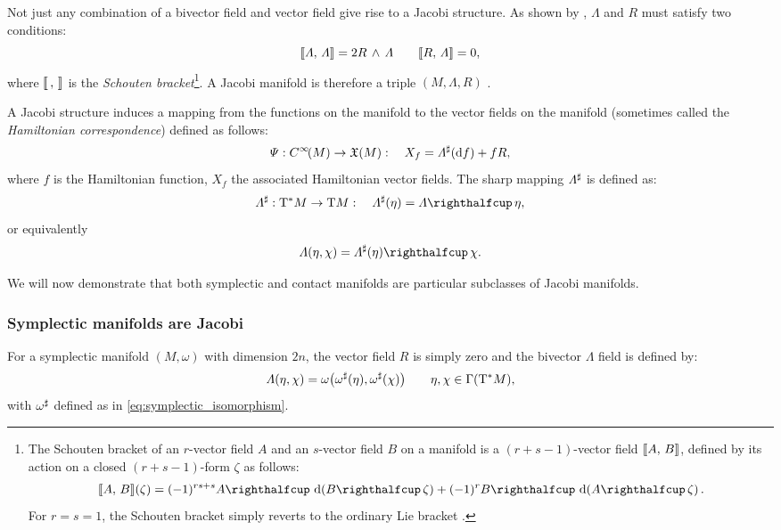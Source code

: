 Not just any combination of a bivector field and vector field give rise to a Jacobi structure. As shown by \citet{lichnerowicz1977}, \(\Lambda\) and \(R\) must satisfy two conditions:
\begin{equation}
     \llbracket\Lambda,\,\Lambda\rrbracket = 2  R\,\wedge\,\Lambda  \qquad \llbracket R,\,\Lambda\rrbracket = 0,
\end{equation}
where \(\llbracket\,,\,\rrbracket\) is the \emph{Schouten bracket}\footnote
{
    The Schouten bracket of an \(r\)-vector field \(A\) and an \(s\)-vector field \(B\) on a manifold is a \((r + s - 1)\)-vector field \(\llbracket A,\,B\rrbracket\), defined by its action on a closed \((r + s -1)\)-form \(\zeta\) as follows:
    \begin{equation}
     \schouten{A}{B}(\zeta) = (-1)^{rs + s}\intpr{A}{\dd{(\intpr{B}{\zeta})}} + (-1)^r \intpr{B}{\dd{(\intpr{A}{\zeta})}}.
\end{equation}
    For \(r = s = 1\), the Schouten bracket simply reverts to the ordinary Lie bracket \cite{dazord1991}.

}. A Jacobi manifold is therefore a triple \((M, \Lambda, R)\) \cite{Libermann1987}.

A Jacobi structure induces a mapping from the functions on the manifold to the vector fields on the manifold (sometimes called the \emph{Hamiltonian correspondence}) \cite{ciaglia2018,mahmood2012} defined as follows:
\begin{equation} 
    \Psi: C^\infty\!\qty(M) \to \mathfrak{X}\qty(M): \quad X_f = \Lambda^\sharp(\dd{f}) + f R,
    \label{eq:jacobi_ham_correspondence}
\end{equation}
where \(f\) is the Hamiltonian function, \(X_f\) the associated Hamiltonian vector fields. The sharp mapping \(\Lambda^\sharp\) is defined as:
\begin{equation}
     \fromDual{\Lambda}: \ctbundle{M} \to \tbundle{M}: \quad \fromDual{\Lambda}(\eta) = \intpr{\Lambda}{\eta},
\end{equation}
or equivalently
\begin{equation}
     \Lambda(\eta, \chi)  = \intpr{\fromDual{\Lambda}(\eta)}{\chi}.
\end{equation}

We will now demonstrate that both symplectic and contact manifolds are particular subclasses of Jacobi manifolds.

\subsubsection{Symplectic manifolds are Jacobi}
For a symplectic manifold \((M, \omega)\) with dimension \(2n\), the vector field \(R\) is simply zero and the bivector \(\Lambda\) field is defined by:
\begin{equation}
     \Lambda(\eta, \chi) = \omega\qty(\omega^\sharp(\eta), \omega^\sharp(\chi)) \qquad \eta, \chi \in \mathrm{\Gamma}\qty(\mathrm{T}^*M),
\end{equation}
with \(\omega^\sharp\) defined as in \cref{eq:symplectic_isomorphism}. 

